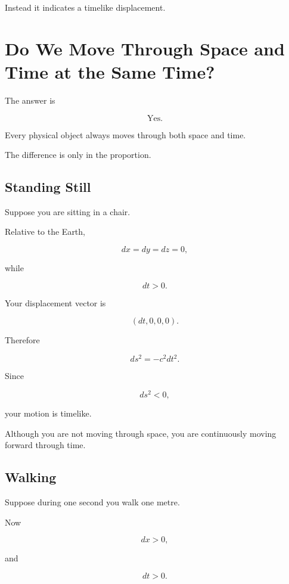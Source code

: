 \documentclass[12pt,a4paper]{article}
\theoremstyle{notespace}
\begin{document}
Instead it indicates a timelike displacement.


\section{Do We Move Through Space and Time at the Same Time?}

The answer is

\[
\boxed{\text{Yes.}}
\]

Every physical object always moves through both space and time.

The difference is only in the proportion.


\subsection{Standing Still}

Suppose you are sitting in a chair.

Relative to the Earth,

\[
dx=dy=dz=0,
\]

while

\[
dt>0.
\]

Your displacement vector is

\[
(dt,0,0,0).
\]

Therefore

\[
ds^2
=
-c^2dt^2.
\]

Since

\[
ds^2<0,
\]

your motion is timelike.

Although you are not moving through space,
you are continuously moving forward through time.


\subsection{Walking}

Suppose during one second you walk one metre.

Now

\[
dx>0,
\]

and

\[
dt>0.
\]
\end{document}

